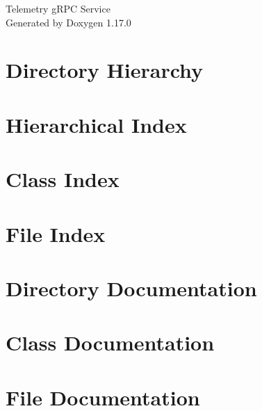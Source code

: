 \documentclass[twoside]{book}
\newcommand{\+}{\discretionary{\mbox{\scriptsize$\hookleftarrow$}}{}{}}
\newcommand{\clearemptydoublepage}{%
    \newpage{\pagestyle{empty}\cleardoublepage}%
  }
\begin{document}
  \raggedbottom
    \hypersetup{pageanchor=false,
                bookmarksnumbered=true,
                pdfencoding=unicode
               }
  \begin{titlepage}
  \vspace*{7cm}
  \begin{center}%
  {\Large Telemetry g\+RPC Service}\\
  \vspace*{1cm}
  {\large Generated by Doxygen 1.17.0}\\
  \end{center}
  \end{titlepage}
  \clearemptydoublepage
  \tableofcontents
  \clearemptydoublepage
  \hypersetup{pageanchor=true}
\chapter{Directory Hierarchy}

\chapter{Hierarchical Index}

\chapter{Class Index}

\chapter{File Index}

\chapter{Directory Documentation}

\chapter{Class Documentation}




\chapter{File Documentation}













\end{document}
